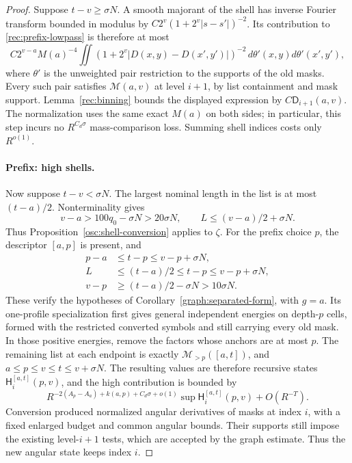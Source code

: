 \begin{proof}
Suppose \(t-v\ge\sigma N\).  A smooth majorant of the shell has
inverse Fourier transform bounded in modulus by
\(C2^v(1+2^v|s-s'|)^{-2}\).  Its contribution to
\eqref{rec:prefix-lowpass} is therefore at most
\[
 C2^{v-a}M(a)^{-4}
 \iint(1+2^v|D(x,y)-D(x',y')|)^{-2}
 \,d\theta'(x,y)d\theta'(x',y'),
\]
where \(\theta'\) is the unweighted pair restriction to the supports
of the old masks.  Every such pair satisfies
\(\mathcal M(a,v)\) at level \(i+1\), by list containment and mask
support.  Lemma~\ref{rec:binning} bounds the displayed expression by
\(C\mathsf D_{i+1}(a,v)\).  The normalization uses the same exact
\(M(a)\) on both sides; in particular, this step incurs no
\(R^{C_d\sigma}\) mass-comparison loss.  Summing shell indices costs
only \(R^{o(1)}\).

\paragraph{Prefix: high shells.}
Now suppose \(t-v<\sigma N\).  The largest nominal length in the
list is at most \((t-a)/2\).  Nonterminality gives
\[
 v-a>100q_0-\sigma N>20\sigma N,\qquad
 L\le(v-a)/2+\sigma N.
\]
Thus Proposition~\ref{osc:shell-conversion} applies to \(\zeta\).
For the prefix choice \(p\), the descriptor \([a,p]\) is present,
and
\begin{align*}
 p-a&\le t-p\le v-p+\sigma N,\\
 L&\le(t-a)/2\le t-p\le v-p+\sigma N,\\
 v-p&\ge(t-a)/2-\sigma N>10\sigma N.
\end{align*}
These verify the hypotheses of Corollary~\ref{graph:separated-form},
with \(g=a\).  Its one-profile specialization first gives general
independent energies on depth-\(p\) cells, formed with the restricted
converted symbols and still carrying every old mask.  In those positive
energies, remove the factors whose anchors are at most \(p\).  The
remaining list at each endpoint is exactly
\(\mathcal M_{>p}([a,t])\), and
\(a\le p\le v\le t\le v+\sigma N\).  The resulting values are therefore
recursive states \(\mathsf H_i^{[a,t]}(p,v)\), and the high contribution
is bounded by
\[
 R^{-2(A_p-A_a)+k(a,p)+C_d\sigma+o(1)}
       \sup\mathsf H_i^{[a,t]}(p,v)+O(R^{-T}).
\]
Conversion produced normalized angular derivatives of masks at index
\(i\), with a fixed enlarged budget and common angular bounds.  Their
supports still impose the existing level-\(i+1\) tests, which are accepted
by the graph estimate.  Thus the new angular state keeps index \(i\).


\end{proof}
